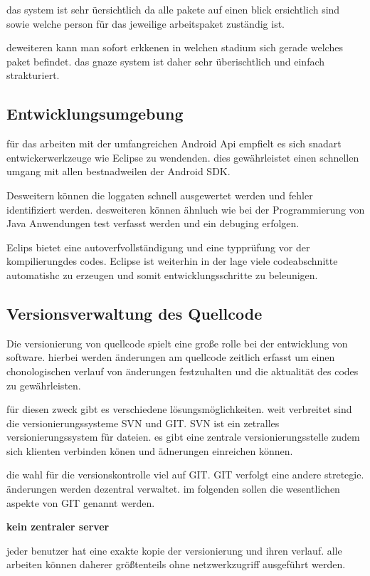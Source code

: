 das system ist sehr üersichtlich da alle pakete auf einen blick ersichtlich sind sowie welche person für das jeweilige arbeitspaket zuständig ist.\newpage

deweiteren kann man sofort erkkenen in welchen stadium sich gerade welches paket befindet. das gnaze system ist daher sehr überischtlich und einfach strakturiert.

\subsection{Entwicklungsumgebung}
für das arbeiten mit der umfangreichen Android Api empfielt es sich snadart entwickerwerkzeuge wie Eclipse zu wendenden. dies gewährleistet einen schnellen umgang mit allen bestnadweilen der Android SDK.

Desweitern können die loggaten schnell ausgewertet werden und fehler identifiziert werden. desweiteren können ähnluch wie bei der Programmierung von Java Anwendungen test verfasst werden und ein debuging erfolgen.

Eclips bietet eine autoverfvollständigung und eine typprüfung vor der kompilierungdes codes. Eclipse ist weiterhin in der lage viele codeabschnitte automatishc zu erzeugen und somit entwicklungsschritte zu beleunigen.

\subsection{Versionsverwaltung des Quellcode}
Die versionierung von quellcode spielt eine große rolle bei der entwicklung von software. hierbei werden änderungen am quellcode zeitlich erfasst um einen chonologischen verlauf von änderungen festzuhalten und die aktualität des codes zu gewährleisten.

für diesen zweck gibt es verschiedene lösungsmöglichkeiten. weit verbreitet sind die versionierungssysteme SVN und GIT.
SVN ist ein zetralles versionierungssystem für dateien.  es gibt eine zentrale versionierungsstelle zudem sich klienten verbinden könen und ädnerungen einreichen können.

die wahl für die versionskontrolle viel auf GIT. GIT verfolgt eine andere stretegie. änderungen werden dezentral verwaltet. im folgenden sollen die wesentlichen aspekte von GIT genannt werden.

\textbf{kein zentraler server}

jeder benutzer hat eine exakte kopie der versionierung und ihren verlauf. alle arbeiten können daherer größtenteils ohne netzwerkzugriff ausgeführt werden.


